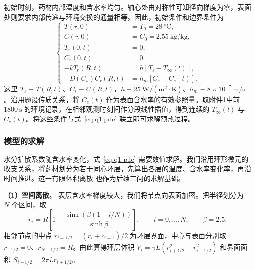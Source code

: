 \documentclass[UTF8,a4paper]{ctexart}
\begin{document}
初始时刻，药材内部温度和含水率均匀。轴心处由对称性可知径向梯度为零，表面处则要求内部传递与环境交换的通量相等。因此，初始条件和边界条件为
\begin{equation}
\left\{
\begin{aligned}
T(r,0) &= T_0 = 28~^\circ\mathrm{C}, \\
C(r,0) &= C_0 = 2.55~\mathrm{kg/kg}, \\
T_r(0,t) &= 0, \\
C_r(0,t) &= 0, \\
-kT_r(R,t) &= h[T_s-T_\infty(t)], \\
-D(C_s)C_r(R,t) &= h_m[C_s-C_e(t)].
\end{aligned}
\right.
\label{eq:q1-conditions}
\end{equation}
这里 \(T_s=T(R,t)\)、\(C_s=C(R,t)\)，\(h=25~\mathrm{W/(m^2\cdot K)}\)、\(h_m=8\times10^{-7}~\mathrm{m/s}\)。沿用题设传质关系，将 \(C_e(t)\) 作为表面含水率的有效参照量。取附件1中前 \(1800~\mathrm{s}\) 的环境记录，在相邻观测时刻间作分段线性插值，得到连续的 \(T_\infty(t)\) 与 \(C_e(t)\)。将这些条件与式~\eqref{eq:q1-pde} 联立即可求解预热过程。

\subsubsection{模型的求解}
\label{sec:q1-solution}

水分扩散系数随含水率变化，式~\eqref{eq:q1-pde} 需要数值求解。我们沿用环形微元的收支关系，将药材划分为若干同心环层，先算出各层的温度、含水率变化率，再沿时间推进。这一有限体积离散\cite{patankar1980} 也作为后续三问的求解基础。

\noindent\textbf{（1）空间离散。}
表层含水率梯度较大，我们将节点向表面加密。把半径划分为 \(N\) 个区间，取
\begin{equation}
r_i=R\left[1-\frac{\sinh\!\left(\beta(1-i/N)\right)}{\sinh\beta}\right],
\qquad i=0,\ldots,N,\qquad \beta=2.5.
\label{eq:q1-mesh}
\end{equation}
相邻节点的中点 \(r_{i+1/2}=(r_i+r_{i+1})/2\) 为环层界面，中心与表面分别取 \(r_{-1/2}=0\)、\(r_{N+1/2}=R\)。由此算得环层体积 \(V_i=\pi L(r_{i+1/2}^2-r_{i-1/2}^2)\) 和界面面积 \(S_{i+1/2}=2\pi Lr_{i+1/2}\)。
\end{document}
